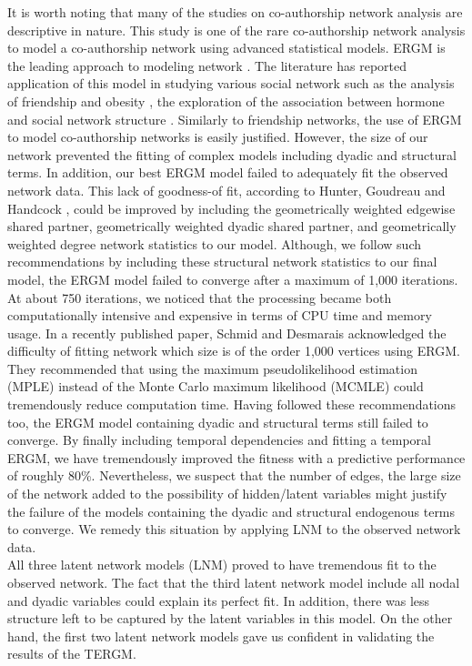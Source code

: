 It is worth noting that many of the studies on co-authorship network analysis are descriptive in nature. This study is one of the rare co-authorship network analysis to model a co-authorship network using advanced statistical models. ERGM is the leading approach to modeling network \cite{schmid_exponential_2017}. The literature has reported application of this model in studying various social network such as the analysis of friendship and obesity \cite{valente_adolescent_2009,de_la_haye_obesity-related_2010}, the exploration of the association between hormone and social network structure \cite{kornienko_hormones_2014}. Similarly to friendship networks, the use of ERGM to model co-authorship networks is easily justified. However, the size of our network prevented the fitting of complex models including dyadic and structural terms. In addition, our best ERGM model failed to adequately fit the observed network data. This lack of goodness-of fit, according to Hunter, Goudreau and Handcock \cite{hunter_goodness_2008}, could be improved by including the geometrically weighted edgewise shared partner, geometrically weighted dyadic shared partner, and geometrically weighted degree network statistics to our model. Although, we follow such recommendations by including these structural network statistics to our final model, the ERGM model failed to converge after a maximum of 1,000 iterations. At about 750 iterations, we noticed that the processing became both computationally intensive and expensive in terms of CPU time and memory usage. In a recently published paper, Schmid and Desmarais \cite{schmid_exponential_2017} acknowledged the difficulty of fitting network which size is of the order 1,000 vertices using ERGM. They recommended that using the maximum pseudolikelihood estimation (MPLE) instead of the Monte Carlo maximum likelihood (MCMLE) could tremendously reduce computation time. Having followed these recommendations too, the ERGM model containing dyadic and structural terms still failed to converge. By finally including temporal dependencies and fitting a temporal ERGM, we have tremendously improved the fitness with a predictive performance of roughly 80\%. Nevertheless, we suspect that the number of edges, the large size of the network added to the possibility of hidden/latent variables might justify the failure of the models containing the dyadic and structural endogenous terms to converge. We remedy this situation by applying LNM to the observed network data. \\
All three latent network models (LNM) proved to have tremendous fit to the observed network. The fact that the third latent network model include all nodal and dyadic variables could explain its perfect fit. In addition, there was less structure left to be captured by the latent variables in this model. On the other hand, the first two latent network models gave us confident in validating the results of the TERGM. \\
